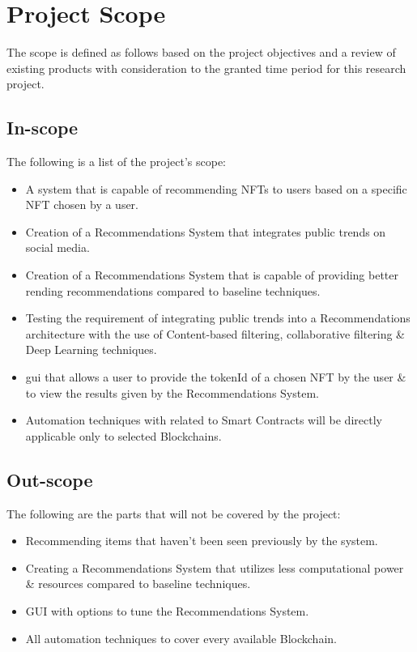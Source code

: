\documentclass[a4paper, 12pt, oneside]{report}
\begin{document}


\chapter{Project Scope}
The scope is defined as follows based on the project objectives and a review of existing products with consideration to the granted time period for this research project.

\section{In-scope}
The following is a list of the project's scope:
\begin{itemize}
\item A system that is capable of recommending NFTs to users based on a specific NFT chosen by a user.
\item Creation of a Recommendations System that integrates public trends on social media.
\item Creation of a Recommendations System that is capable of providing better rending recommendations compared to baseline techniques.
\item Testing the requirement of integrating public trends into a Recommendations architecture with the use of Content-based filtering, collaborative filtering \& Deep Learning techniques.
\item \Gls{gui} that allows a user to provide the tokenId of a chosen NFT by the user \& to view the results given by the Recommendations System.
\item Automation techniques with related to Smart Contracts will be directly applicable only to selected Blockchains.
\end{itemize}

\section{Out-scope}
The following are the parts that will not be covered by the project:
\begin{itemize}
\item Recommending items that haven't been seen previously by the system.
\item Creating a Recommendations System that utilizes less computational power \& resources compared to baseline techniques.
\item GUI with options to tune the Recommendations System.
\item All automation techniques to cover every available Blockchain.
\end{itemize}
\end{document}
